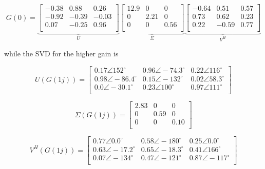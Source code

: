 \begin{equation}
	G(0) = 
	\underbrace{
		\begin{bmatrix}
		-0.38 & 0.88 & 0.26\\
		-0.92 & -0.39 & -0.03\\
		0.07 & -0.25 & 0.96\\
		\end{bmatrix}
	}_{U}
	\underbrace{
		\begin{bmatrix}
		12.9 & 0 & 0\\
		0 & 2.21 & 0\\
		0 & 0 & 0.56\\
		\end{bmatrix}
	}_{\Sigma}
	\underbrace{
		\begin{bmatrix}
		-0.64 & 0.51 & 0.57 \\
		0.73 & 0.62 & 0.23 \\
		0.22 & -0.59 & 0.77\\
		\end{bmatrix}
	}_{V^H}
\end{equation}

while the SVD for the higher gain is 

\begin{equation}
U(G(1j)) = 
	\begin{bmatrix}
	0.17\angle152^{\circ} & 0.96\angle-74.3^{\circ} & 0.22\angle116^{\circ}\\
	0.98\angle-86.4^{\circ} & 0.15\angle-132^{\circ} & 0.02\angle58.3^{\circ}\\
	0.0\angle-30.1^{\circ} & 0.23\angle100^{\circ} & 0.97\angle111^{\circ}\\
	\end{bmatrix}
\end{equation}

\begin{equation}
	\Sigma(G(1j)) =
		\begin{bmatrix}
		2.83 & 0 & 0\\
		0 & 0.59 & 0\\
		0 & 0 & 0.10\\
		\end{bmatrix}
\end{equation}

\begin{equation}
	V^H(G(1j)) = 
		\begin{bmatrix}
		0.77\angle0.0^{\circ} & 0.58\angle-180^{\circ} & 0.25\angle0.0^{\circ}\\
		0.63\angle-17.2^{\circ} & 0.65\angle-18.3^{\circ} & 0.41\angle166^{\circ}\\
		0.07\angle-134^{\circ} & 0.47\angle-121^{\circ} & 0.87\angle-117^{\circ}\\
		\end{bmatrix}
\end{equation}

